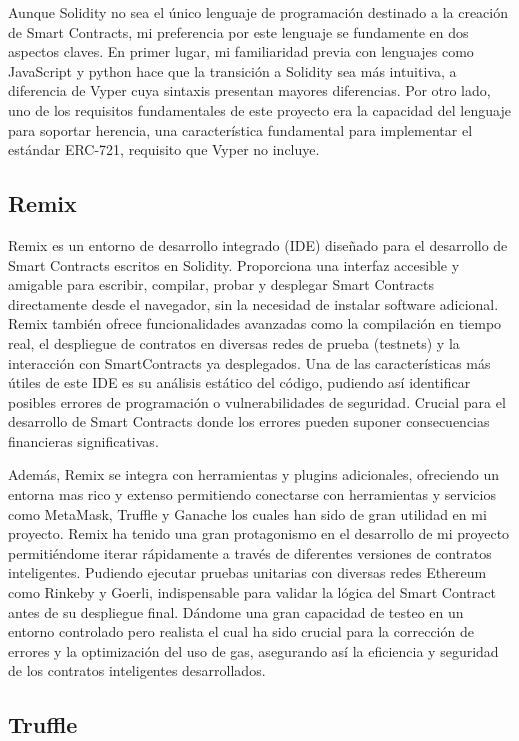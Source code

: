 Aunque Solidity no sea el único lenguaje de programación destinado a la creación de Smart Contracts, mi preferencia por este lenguaje se fundamente en dos aspectos claves.
En primer lugar, mi familiaridad previa con lenguajes como JavaScript y python hace que la transición a Solidity sea más intuitiva, a diferencia de Vyper cuya sintaxis presentan mayores diferencias.
Por otro lado, uno de los requisitos fundamentales de este proyecto era la capacidad del lenguaje para soportar herencia, una característica fundamental para implementar el estándar ERC-721, requisito que Vyper no incluye.


\subsection{Remix}

Remix es un entorno de desarrollo integrado (IDE) diseñado para el desarrollo de Smart Contracts escritos en Solidity. Proporciona una interfaz accesible y amigable para escribir, compilar, probar y desplegar Smart Contracts directamente desde el navegador, sin la necesidad de instalar software adicional.
Remix también ofrece funcionalidades avanzadas como la compilación en tiempo real, el despliegue de contratos en diversas redes de prueba (testnets) y la interacción con SmartContracts ya desplegados.
Una de las características más útiles de este IDE es su análisis estático del código, pudiendo así identificar posibles errores de programación o vulnerabilidades de seguridad. Crucial para el desarrollo de Smart Contracts donde los errores pueden suponer consecuencias financieras significativas.

Además, Remix se integra con herramientas y plugins adicionales, ofreciendo un entorna mas rico y extenso permitiendo conectarse con herramientas y servicios como MetaMask, Truffle y Ganache los cuales han sido de gran utilidad en mi proyecto.
Remix ha tenido una gran protagonismo en el desarrollo de mi proyecto permitiéndome iterar rápidamente a través de diferentes versiones de contratos inteligentes. Pudiendo ejecutar pruebas unitarias con diversas redes Ethereum como Rinkeby y Goerli, indispensable para validar la lógica del Smart Contract antes de su despliegue final. Dándome una gran capacidad de testeo en un entorno controlado pero realista el cual ha sido crucial para la corrección de errores y la optimización del uso de gas, asegurando así la eficiencia y seguridad de los contratos inteligentes desarrollados.


\subsection{Truffle}

